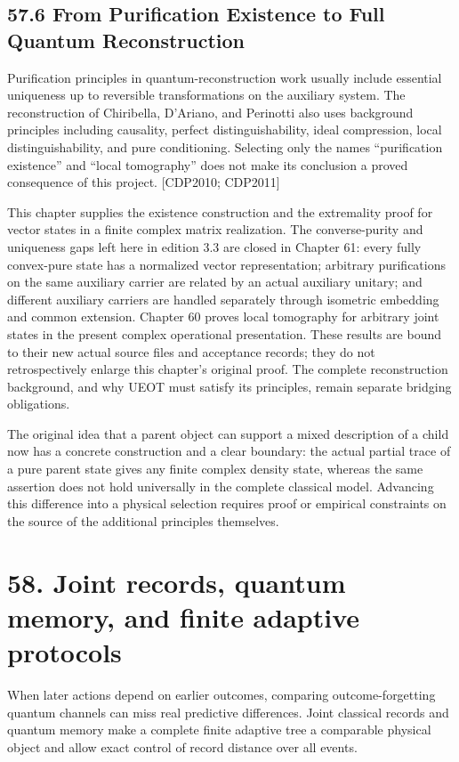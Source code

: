 \documentclass[
  11pt,
  oneside]{book}
\begin{document}
\section{57.6 From Purification Existence to Full Quantum
Reconstruction}

Purification principles in quantum-reconstruction work usually include
essential uniqueness up to reversible transformations on the auxiliary
system. The reconstruction of Chiribella, D'Ariano, and Perinotti also
uses background principles including causality, perfect
distinguishability, ideal compression, local distinguishability, and
pure conditioning. Selecting only the names ``purification existence''
and ``local tomography'' does not make its conclusion a proved
consequence of this project. {[}CDP2010; CDP2011{]}

This chapter supplies the existence construction and the extremality
proof for vector states in a finite complex matrix realization. The
converse-purity and uniqueness gaps left here in edition 3.3 are closed
in Chapter 61: every fully convex-pure state has a normalized vector
representation; arbitrary purifications on the same auxiliary carrier
are related by an actual auxiliary unitary; and different auxiliary
carriers are handled separately through isometric embedding and common
extension. Chapter 60 proves local tomography for arbitrary joint states
in the present complex operational presentation. These results are bound
to their new actual source files and acceptance records; they do not
retrospectively enlarge this chapter's original proof. The complete
reconstruction background, and why UEOT must satisfy its principles,
remain separate bridging obligations.

The original idea that a parent object can support a mixed description
of a child now has a concrete construction and a clear boundary: the
actual partial trace of a pure parent state gives any finite complex
density state, whereas the same assertion does not hold universally in
the complete classical model. Advancing this difference into a physical
selection requires proof or empirical constraints on the source of the
additional principles themselves.

\chapter{58. Joint records, quantum memory, and finite adaptive
protocols}\label{ch-58}

When later actions depend on earlier outcomes, comparing
outcome-forgetting quantum channels can miss real predictive
differences. Joint classical records and quantum memory make a complete
finite adaptive tree a comparable physical object and allow exact
control of record distance over all events.
\end{document}
